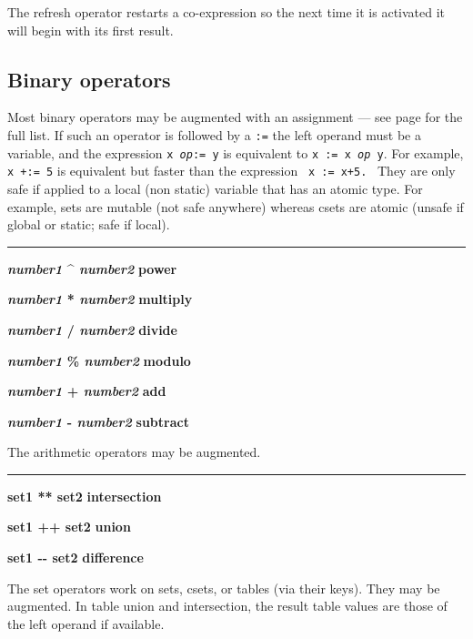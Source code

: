 \noindent
{}The refresh operator restarts a
co-expression so the next time it is activated it will begin with its
first result.

\subsection*{Binary operators}

Most binary operators may be augmented with an
assignment
--- see page \pageref{AugOps} for the full list.
If such an operator is followed
by a \texttt{:=} the left operand must be a variable, and the
expression \texttt{x }\texttt{\textit{op}}\texttt{:= y} is equivalent
to \texttt{x := x }\texttt{\textit{op}}\texttt{ y}. For example,
\texttt{x +:= 5} is equivalent but faster than the expression
\ \texttt{x := x+5.}
 \
They are only safe if applied to a local (non static) variable that
has an atomic type. For example, sets are mutable (not safe anywhere)
whereas csets are atomic (unsafe if global or static; safe if local).

\bigskip\hrule\vspace{0.1cm}
\noindent
{\bf \textit{number1} \^{} \textit{number2} } \hfill {\bf power}
\index{power, exponent \^{}}

\noindent
{\bf \textit{number1} * \textit{number2} } \hfill {\bf multiply}

\noindent
{\bf \textit{number1} / \textit{number2} } \hfill {\bf divide}

\noindent
{\bf \textit{number1} \% \textit{number2} } \hfill {\bf modulo}

\noindent
{\bf \textit{number1} + \textit{number2} } \hfill {\bf add}

\noindent
{\bf \textit{number1} - \textit{number2} } \hfill {\bf subtract}

\noindent
The arithmetic operators may be augmented.

\bigskip\hrule\vspace{0.1cm}
\noindent
{\bf set1 ** set2 } \hfill {\bf intersection}

\noindent
{\bf set1 ++ set2 } \hfill {\bf union}

\noindent
{\bf set1 -{}- set2 } \hfill {\bf difference}

\noindent
The set operators work on sets, csets, or tables (via their keys).
They may be augmented. In table union and intersection, the result
table values are those of the left operand if available.

